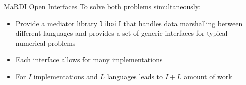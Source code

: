 \documentclass[11pt, aspectratio=169]{beamer}
\begin{document}
\begin{frame}{MaRDI Open Interfaces}
  To solve both problems simultaneously:
  \begin{itemize}
    \item Provide a mediator library \texttt{liboif} that handles
          data marshalling between different languages and provides a set
          of generic interfaces for typical numerical problems
    \item Each interface allows for many implementations
    \item For $I$ implementations and $L$ languages leads to $I + L$
          amount of work
  \end{itemize}
\end{frame}
\end{document}
